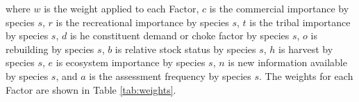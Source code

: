 \documentclass[11pt,
  english,
  a4paper,
]{article}
\begin{document}
where {\(w\)\leavevmode\tagmcend\tagstructend} is the weight applied to each Factor, {\(c\)\leavevmode\tagmcend\tagstructend} is the commercial importance by species {\(s\)\leavevmode\tagmcend\tagstructend}, {\(r\)\leavevmode\tagmcend\tagstructend} is the recreational importance by species {\(s\)\leavevmode\tagmcend\tagstructend}, {\(t\)\leavevmode\tagmcend\tagstructend} is the tribal importance by species {\(s\)\leavevmode\tagmcend\tagstructend}, {\(d\)\leavevmode\tagmcend\tagstructend} is he constituent demand or choke factor by species {\(s\)\leavevmode\tagmcend\tagstructend}, {\(o\)\leavevmode\tagmcend\tagstructend} is rebuilding by species {\(s\)\leavevmode\tagmcend\tagstructend}, {\(b\)\leavevmode\tagmcend\tagstructend} is relative stock status by species {\(s\)\leavevmode\tagmcend\tagstructend}, {\(h\)\leavevmode\tagmcend\tagstructend} is harvest by species {\(s\)\leavevmode\tagmcend\tagstructend}, {\(e\)\leavevmode\tagmcend\tagstructend} is ecosystem importance by species {\(s\)\leavevmode\tagmcend\tagstructend}, {\(n\)\leavevmode\tagmcend\tagstructend} is new information available by species {\(s\)\leavevmode\tagmcend\tagstructend}, and {\(a\)\leavevmode\tagmcend\tagstructend} is the assessment frequency by species {\(s\)\leavevmode\tagmcend\tagstructend}. The weights for each Factor are shown in Table \ref{tab:weights}.

\leavevmode\tagmcend\tagstructend\par
\end{document}
